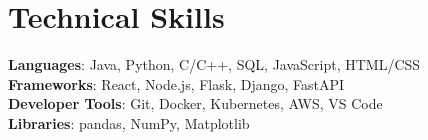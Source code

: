\section{Technical Skills}
 \begin{itemize}[leftmargin=0.15in, label={}]
    \small{\item{
     \textbf{Languages}{: Java, Python, C/C++, SQL, JavaScript, HTML/CSS} \\
     \textbf{Frameworks}{: React, Node.js, Flask, Django, FastAPI} \\
     \textbf{Developer Tools}{: Git, Docker, Kubernetes, AWS, VS Code} \\
     \textbf{Libraries}{: pandas, NumPy, Matplotlib}
    }}
 \end{itemize}
